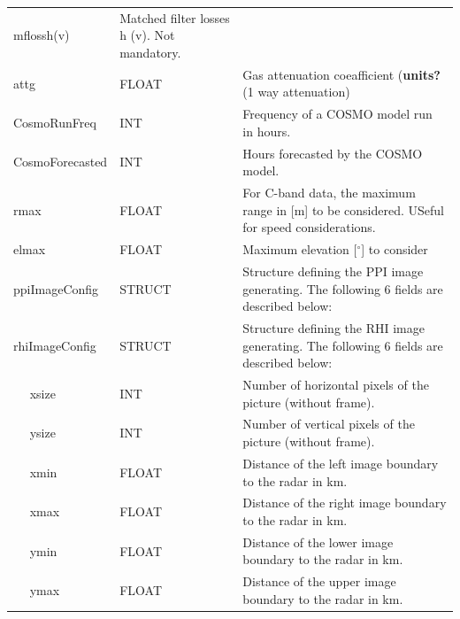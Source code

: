 \documentclass[a4paper,11pt,pdftex,twoside]{scrartcl}
\renewcommand{\bf}{\normalfont \bfseries}
\begin{document}
{{{\begin{longtable}{p{}p{}p{}}
mflossh(v)            & Matched filter losses h (v). Not mandatory. \\
attg                & FLOAT & Gas attenuation coeafficient ({\bf units?} (1 way attenuation) \\
CosmoRunFreq & INT &  Frequency of a COSMO model run in hours.\\
CosmoForecasted & INT & Hours forecasted by the COSMO model.\\
rmax            & FLOAT & For C-band data, the maximum range in [m] to be considered. USeful for speed
                                 considerations.   \\
elmax           & FLOAT & Maximum elevation [$^\circ$] to consider  \\
ppiImageConfig     & STRUCT    & Structure defining the PPI image generating. The following 6
                                 fields are described below:\\
rhiImageConfig     & STRUCT    & Structure defining the RHI image generating. The following 6
                                 fields are described below:\\
$\quad$ xsize      & INT       & Number of horizontal pixels of the picture (without frame).\\
$\quad$ ysize      & INT       & Number of vertical pixels of the picture (without frame).\\
$\quad$ xmin       & FLOAT     & Distance of the left image boundary to the radar in km.\\
$\quad$ xmax       & FLOAT     & Distance of the right image boundary to the radar in km.\\
$\quad$ ymin       & FLOAT     & Distance of the lower image boundary to the radar in km.\\
$\quad$ ymax       & FLOAT     & Distance of the upper image boundary to the radar in km.\\


\end{longtable}}}}
\end{document}
